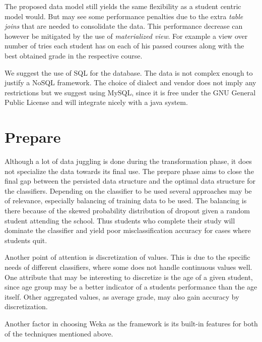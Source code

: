 \noindent
The proposed data model still yields the same flexibility as a student centric model would. 
But may see some performance penalties due to the extra \textit{table joins} that are needed to consolidate the data.
This performance decrease can however be mitigated by the use of \textit{materialized view}.
For example a view over number of tries each student has on each of his passed courses along with the best obtained grade in the respective course.

\bigskip\noindent
We suggest the use of SQL for the database. 
The data is not complex enough to justify a NoSQL framework.
The choice of dialect and vendor does not imply any restrictions but we suggest using MySQL, since it is free under the GNU General Public License and will integrate nicely with a java system.

\section{Prepare}
Although a lot of data juggling is done during the transformation phase, it does not specialize the data towards its final use. 
The prepare phase aims to close the final gap between the persisted data structure and the optimal data structure for the classifiers.
Depending on the classifier to be used several approaches may be of relevance, especially balancing of training data to be used.
The balancing is there because of the skewed probability distribution of dropout given a random student attending the school.
Thus students who complete their study will dominate the classifier and yield poor misclassification accuracy for cases where students quit.

\bigskip\noindent
Another point of attention is discretization of values. 
This is due to the specific needs of different classifiers, where some does not handle continuous values well. 
One attribute that may be interesting to discretize is the age of a given student, 
since age group may be a better indicator of a students performance than the age itself. 
Other aggregated values, as average grade, may also gain accuracy by discretization.

\bigskip\noindent
Another factor in choosing Weka as the framework is its built-in features for both of the techniques mentioned above. 

